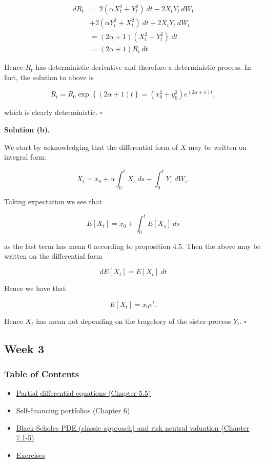 \documentclass[
]{article}
\begin{document}
\begin{align*}
dR_t&=2(\alpha X_t^2+Y_t^2)\ dt-2X_tY_t\ dW_t\\
&+2(\alpha Y_t^2+X_t^2)\ dt+2X_tY_t\ dW_t\\
&=(2\alpha +1)(X_t^2 + Y_t^2)\ dt\\
&=(2\alpha +1)R_t\ dt
\end{align*}

Hence \(R_t\) has deterministic derivative and therefore a deterministic
process. In fact, the solution to above is

\[
R_t=R_0\exp\left\{(2\alpha + 1)t\right\}=(x_0^2+y_0^2)e^{(2\alpha + 1)t},
\]

which is clearly deterministic. \(\square\)

\textbf{Solution (b).}

We start by acknowledging that the differential form of \(X\) may be
written on integral form:

\[
X_t=x_0+\alpha\int_0^tX_s\ ds-\int_0^tY_s\ dW_s.
\]

Taking expectation we see that

\[
E[X_t]=x_0+\int_0^tE[X_s]\ ds
\]

as the last term has mean 0 according to proposition 4.5. Then the above
may be written on the differential form

\[
dE[X_t]=E[X_t]\ dt
\]

Hence we have that

\[
E[X_t]=x_0e^{t}.
\]

Hence \(X_t\) has mean not depending on the tragetory of the
sister-process \(Y_t\). \(\square\)

\hypertarget{week-3}{%
\subsection{Week 3}\label{week-3}}

\hypertarget{table-of-contents-2}{%
\subsubsection{Table of Contents}\label{table-of-contents-2}}

\begin{itemize}
\item
  \protect\hyperlink{partial-differential-equations}{Partial
  differential equations (Chapter 5.5)}
\item
  \protect\hyperlink{self-financing-portfolios}{Self-financing
  portfolios (Chapter 6)}
\item
  \protect\hyperlink{black-scholes-pde}{Black-Scholes PDE (classic
  approach) and risk neutral valuation (Chapter 7.1-5)}
\item
  \protect\hyperlink{exercises-week-3}{Exercises}
\end{itemize}
\end{document}
